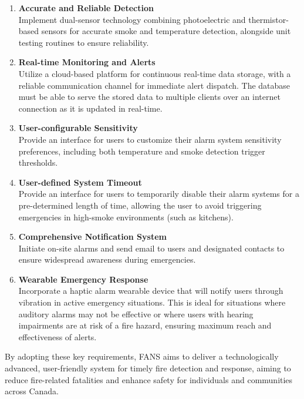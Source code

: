 \begin{enumerate}
    \item \textbf{Accurate and Reliable Detection} \\ Implement dual-sensor technology combining photoelectric and thermistor-based
          sensors for accurate smoke and temperature detection, alongside unit testing routines to ensure reliability.

    \item \textbf{Real-time Monitoring and Alerts} \\ Utilize a cloud-based platform for continuous real-time data
          storage, with a reliable communication channel for immediate alert dispatch. The database must be able to
          serve the stored data to multiple clients over an internet connection as it is updated in real-time.

    \item \textbf{User-configurable Sensitivity} \\ Provide an interface for users to customize their alarm
          system sensitivity preferences, including both temperature and smoke detection trigger thresholds.

    \item \textbf{User-defined System Timeout} \\ Provide an interface for users to temporarily disable their alarm
          systems for a pre-determined length of time, allowing the user to avoid triggering emergencies in high-smoke
          environments (such as kitchens).

    \item \textbf{Comprehensive Notification System} \\ Initiate on-site alarms and send email to users and designated contacts to ensure
          widespread awareness during emergencies.

    \item \textbf{Wearable Emergency Response} \\ Incorporate a haptic alarm wearable device that will notify users
          through vibration in active emergency situations. This is ideal for situations where auditory alarms may not
          be effective or where users with hearing impairments are at risk of a fire hazard, ensuring maximum reach and
          effectiveness of alerts.

\end{enumerate}

By adopting these key requirements, FANS aims to deliver a technologically advanced, user-friendly system for timely
fire detection and response, aiming to reduce fire-related fatalities and enhance safety for individuals and
communities across Canada.
